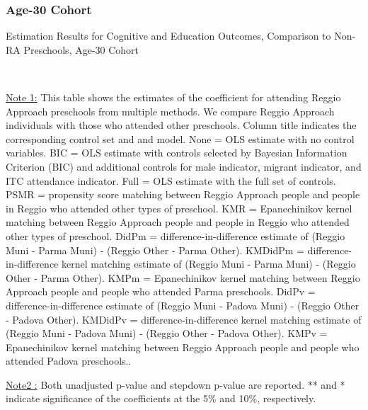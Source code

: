 \subsubsection{Age-30 Cohort}
\begin{table}[H] \caption{Estimation Results for Cognitive and Education Outcomes, Comparison to Non-RA Preschools, Age-30 Cohort} \label{ols-CN-adult30-reg-other}
\scalebox{0.6}{}
\vspace{1ex} \\
\footnotesize\raggedright{\underline{Note 1:} This table shows the estimates of the coefficient for attending Reggio Approach preschools from multiple methods. We compare Reggio Approach individuals with those who attended other preschools. Column title indicates the corresponding control set and and model. None = OLS estimate with no control variables. BIC = OLS estimate with controls selected by Bayesian Information Criterion (BIC) and additional controls for male indicator, migrant indicator, and ITC attendance indicator. Full = OLS estimate with the full set of controls. PSMR =  propensity score matching between Reggio Approach people and people in Reggio who attended other types of preschool. KMR = Epanechinikov kernel matching between Reggio Approach people and people in Reggio who attended other types of preschool. DidPm = difference-in-difference estimate of (Reggio Muni - Parma Muni) - (Reggio Other - Parma Other). KMDidPm = difference-in-difference kernel matching estimate of (Reggio Muni - Parma Muni) - (Reggio Other - Parma Other).   KMPm = Epanechinikov kernel matching between Reggio Approach people and people who attended Parma preschools. DidPv = difference-in-difference estimate of (Reggio Muni - Padova Muni) - (Reggio Other - Padova Other). KMDidPv = difference-in-difference kernel matching estimate of (Reggio Muni - Padova Muni) - (Reggio Other - Padova Other).  KMPv = Epanechinikov kernel matching between Reggio Approach people and people who attended Padova preschools..}

\footnotesize\raggedright{\underline{Note2 :} Both unadjusted p-value and stepdown p-value are reported. ** and * indicate significance of the coefficients at the 5\% and 10\%, respectively.}
\end{table}

